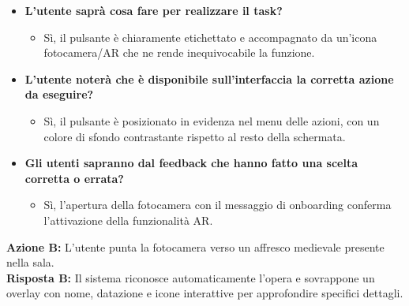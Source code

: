 \begin{itemize}[nosep, leftmargin=1.6em]
    \item \textbf{L'utente saprà cosa fare per realizzare il task?}
    \begin{itemize}[nosep, leftmargin=1.6em]
        \item Sì, il pulsante è chiaramente etichettato e accompagnato da un'icona fotocamera/AR che ne rende inequivocabile la funzione.
    \end{itemize}
    \item \textbf{L'utente noterà che è disponibile sull'interfaccia la corretta azione da eseguire?}
    \begin{itemize}[nosep, leftmargin=1.6em]
        \item Sì, il pulsante è posizionato in evidenza nel menu delle azioni, con un colore di sfondo contrastante rispetto al resto della schermata.
    \end{itemize}
    \item \textbf{Gli utenti sapranno dal feedback che hanno fatto una scelta corretta o errata?}
    \begin{itemize}[nosep, leftmargin=1.6em]
        \item Sì, l'apertura della fotocamera con il messaggio di onboarding conferma l'attivazione della funzionalità AR.
    \end{itemize}
\end{itemize}

\vspace{0.3cm}
\noindent\textbf{Azione B:} L'utente punta la fotocamera verso un affresco medievale presente nella sala.\\
\textbf{Risposta B:} Il sistema riconosce automaticamente l'opera e sovrappone un overlay con nome, datazione e icone interattive per approfondire specifici dettagli.

